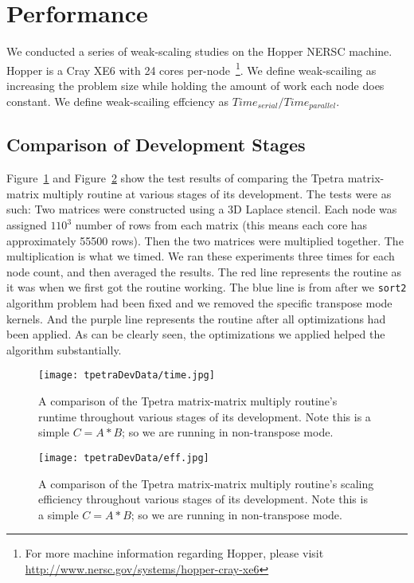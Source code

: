 \documentclass{article}
\begin{document}
\section{Performance}
\label{perfSect}
We conducted a series of weak-scaling studies on the Hopper NERSC machine. Hopper is a Cray XE6 with 24 cores
per-node~\footnote{For more machine information regarding Hopper, please visit \url{http://www.nersc.gov/systems/hopper-cray-xe6}}.
We define weak-scailing as increasing the problem size while holding the amount of work each node does constant. We define
weak-scailing effciency as $Time_{serial}/Time_{parallel}$.

\subsection{Comparison of Development Stages}
Figure~\ref{tpetracomptime} and Figure~\ref{tpetracompeff} show the test results of comparing the Tpetra matrix-matrix multiply 
routine at various stages of its 
development.  The tests were as such: Two matrices were constructed using a 3D Laplace stencil. Each node was assigned 
$110^3$ number of rows from each matrix (this means each core has approximately 55500 rows). 
Then the two matrices were multiplied together. The multiplication is what 
we timed. We ran these experiments three times for each node count, and then averaged the results.
The red line represents the routine as it was when we first got the routine working. The blue line is from after 
we \verb!sort2! algorithm problem had been fixed and we removed the specific transpose mode kernels. 
And the purple line represents the routine after all optimizations had been applied.
As can be clearly seen, the optimizations we applied helped the algorithm substantially.

\begin{figure}
\texttt{[image: tpetraDevData/time.jpg]}
\caption[Time Comparison]{A comparison of the Tpetra matrix-matrix multiply routine's runtime 
throughout various stages of its development. Note this is a simple $C=A*B$; so we are running in non-transpose mode.}
\label{tpetracomptime}
\end{figure}

\begin{figure}
\texttt{[image: tpetraDevData/eff.jpg]}
\caption[Efficiency Comparison]{A comparison of the Tpetra matrix-matrix multiply routine's scaling efficiency
throughout various stages of its development. Note this is a simple $C=A*B$; so we are running in non-transpose mode.}
\label{tpetracompeff}
\end{figure}
\end{document}
